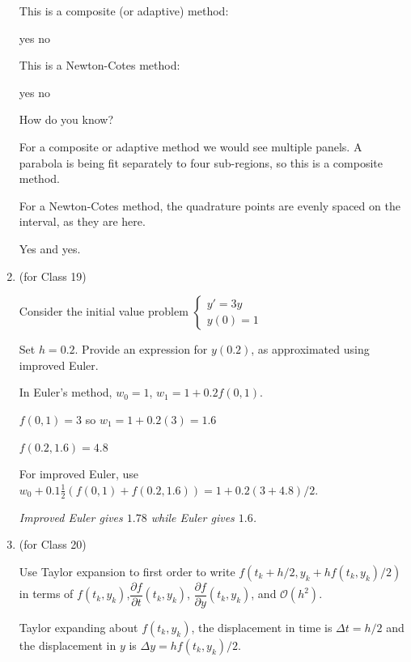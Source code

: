 \documentclass[12pt,letterpaper,answers]{exam}
\begin{document}
\begin{enumerate}
This is a composite (or adaptive) method:
\begin{oneparchoices}
\choice yes \choice no
\end{oneparchoices}

This is a Newton-Cotes method:
\begin{oneparchoices}
\choice yes \choice no
\end{oneparchoices}

How do you know?

\begin{solution}
For a composite or adaptive method we would see multiple panels.  A parabola is being fit separately to four sub-regions, so this is a composite method.  

For a Newton-Cotes method, the quadrature points are evenly spaced on the interval, as they are here.

Yes and yes.
\end{solution}


\item (for Class 19)

Consider the initial value problem $\left\{\begin{array}{l}
y' = 3y \\
y(0) = 1
\end{array}
\right.$

Set $h = 0.2$.  Provide an expression for $y(0.2)$, as approximated using improved Euler.

\begin{solution}
In Euler's method, $w_0 = 1$, $w_1 = 1 + 0.2f(0,1)$.

$f(0,1) = 3$ so $w_1 = 1 + 0.2(3) = 1.6$  

$f(0.2,1.6) = 4.8$

For improved Euler, use $w_0 + 0.1 \frac{1}{2}(f(0,1) +f(0.2,1.6)) = 1+0.2(3+4.8)/2$.

\emph{Improved Euler gives $1.78$ while Euler gives $1.6$.}
\end{solution}

\item (for Class 20)

Use Taylor expansion to first order to write $f(t_k+h/2,y_k+hf(t_k,y_k)/2)$ in terms of $f(t_k, y_k)$,$\dfrac{\partial f}{\partial t}(t_k,y_k)$, $\dfrac{\partial f}{\partial y}(t_k,y_k)$, and $\mathcal{O}(h^2)$.

\begin{solution}
Taylor expanding about $f(t_k, y_k)$, the displacement in time is $\Delta t = h/2$ and the displacement in $y$ is $\Delta y = hf(t_k,y_k)/2$.


\end{solution}
\end{enumerate}
\end{document}
